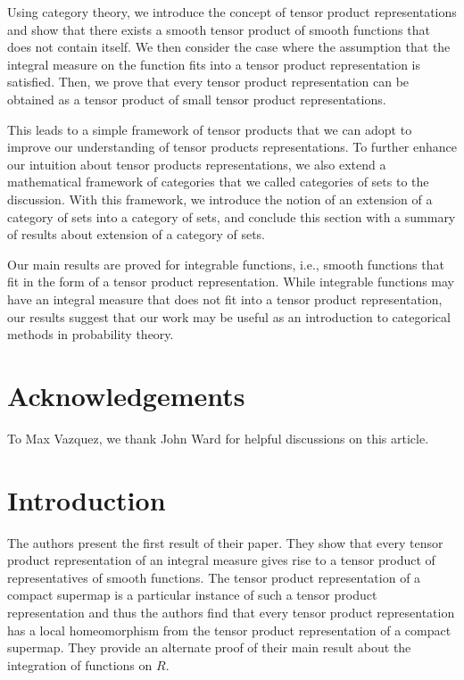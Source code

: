 \documentclass[a4paper,reqno,oneside]{article}
\begin{document}
Using category theory, we introduce the concept of tensor product representations and show that there exists a smooth tensor product of smooth functions that does not contain itself. We then consider the case where the assumption that the integral measure on the function fits into a tensor product representation is satisfied. Then, we prove that every tensor product representation can be obtained as a tensor product of small tensor product representations. 

This leads to a simple framework of tensor products that we can adopt to improve our understanding of tensor products representations. To further enhance our intuition about tensor products representations, we also extend a mathematical framework of categories that we called categories of sets to the discussion. With this framework, we introduce the notion of an extension of a category of sets into a category of sets, and conclude this section with a summary of results about extension of a category of sets. 

Our main results are proved for integrable functions, i.e., smooth functions that fit in the form of a tensor product representation. While integrable functions may have an integral measure that does not fit into a tensor product representation, our results suggest that our work may be useful as an introduction to categorical methods in probability theory.

\section*{Acknowledgements} %
To Max Vazquez, we thank John Ward for helpful discussions on this article.

\section*{Introduction} %
The authors present the first result of their paper. They show that every tensor product representation of an integral measure gives rise to a tensor product of representatives of smooth functions. The tensor product representation of a compact supermap is a particular instance of such a tensor product representation and thus the authors find that every tensor product representation has a local homeomorphism from the tensor product representation of a compact supermap. They provide an alternate proof of their main result about the integration of functions on $R$.
\end{document}
